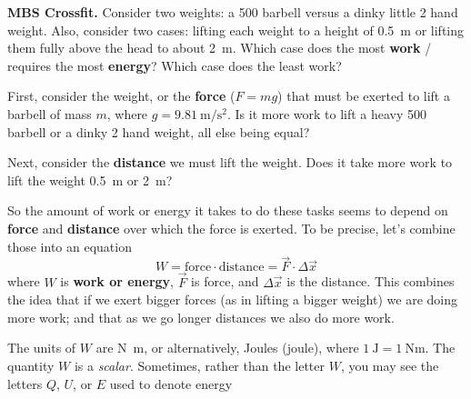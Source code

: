 \documentclass[handout]{tufte-handout}
\begin{document}
\textbf{MBS Crossfit.} Consider two weights: a \SI{500}{\pound} barbell versus a dinky little \SI{2}{\pound} hand weight. Also, consider two cases: lifting each weight to a height of \SI{0.5}{\meter} or lifting them fully above the head to about \SI{2}{\meter}. Which case does the most \textbf{work} / requires the most \textbf{energy}? Which case does the least work? 

First, consider the weight, or the \textbf{force} ($F=mg$) that must be exerted to lift a barbell of mass $m$, where $g=\SI{9.81}{\meter\per\second\squared}$. Is it more work to lift a heavy \SI{500}{\pound} barbell or a dinky \SI{2}{\pound} hand weight, all else being equal?

Next, consider the \textbf{distance} we must lift the weight.  Does it take more work to lift the weight \SI{0.5}{\meter} or \SI{2}{\meter}? 

So the amount of work or energy it takes to do these tasks seems to depend on \textbf{force} and \textbf{distance} over which the force is exerted. To be precise, let's combine those into an equation
\begin{equation}
W = \text{force}\cdot\text{distance} = \vec{F}\cdot\Delta\vec{x}
\label{eq:workdefn}
\end{equation}
where $W$ is \textbf{work or energy}, $\vec{F}$ is force, and $\Delta\vec{x}$ is the distance. This combines the idea that if we exert bigger forces (as in lifting a bigger weight) we are doing more work; and that as we go longer distances we also do more work. 

The units of $W$ are \si{\newton\meter}, or alternatively, Joules (\si{joule}), where $\SI{1}{\joule}=\SI{1}{\newton\meter}$. The quantity $W$ is a \emph{scalar}. Sometimes, rather than the letter $W$, you may see the letters $Q$, $U$, or $E$ used to denote energy 
\end{document}

